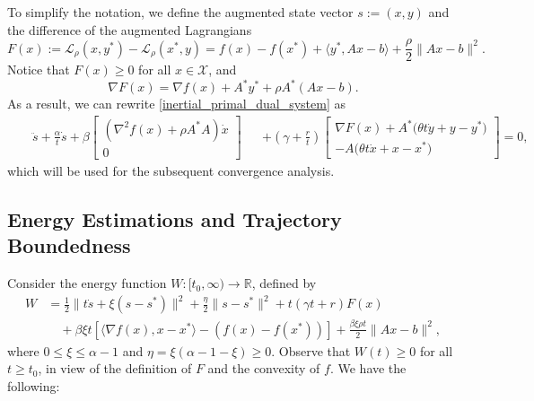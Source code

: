 \documentclass[pdflatex,sn-mathphys-num]{sn-jnl}
\theoremstyle{thmstyleone}
\theoremstyle{thmstyletwo}
\theoremstyle{thmstylethree}
\newcommand{\R}{\mathbb{R}}
\newcommand{\X}{\mathcal{X}}
\begin{document}
To simplify the notation, we define the augmented state vector $s := (x, y)$ and the difference of the augmented Lagrangians
\begin{equation}\label{E: F_ALM}
F(x) := \mathcal{L}_\rho(x,y^*) - \mathcal{L}_\rho(x^*,y) 
= f(x) - f(x^*) + \langle y^*, Ax-b \rangle + \frac{\rho}{2}\| Ax-b \|^2.
\end{equation}
Notice that $F(x)\ge 0$ for all $x\in\X$, and
\begin{equation*}
\nabla F(x) = 
\nabla f(x) + A^* y^* + \rho A^*(Ax-b).
\end{equation*}  
As a result, we can rewrite \eqref{inertial_primal_dual_system} as
\begin{equation}\label{E: primal_dual}
\begin{aligned}
&&\ddot{s} + \frac{\alpha}{t}\dot{s}+ \beta\begin{bmatrix}
 \left( \nabla^2 f(x) + \rho A^* A \right) \dot{x}  \\
0
\end{bmatrix}  
&& + \left( \gamma + \frac{r}{t} \right) \begin{bmatrix}
\nabla F(x)+A^*\big( \theta t \dot{y} + y - y^* \big)\\
-A \big( \theta t \dot{x} + x-x^* \big)
\end{bmatrix} = 0,
\end{aligned}
\end{equation}
which will be used for the subsequent convergence analysis.




\subsection{Energy Estimations and Trajectory Boundedness}
Consider the energy function $W:[t_0,\infty)\to\R$, defined by
\begin{equation}\label{E: W}
\begin{aligned}
W &= \frac{1}{2}\| t\dot{s} + \xi(s-s^*) \|^2 + \frac{\eta}{2}\| s-s^* \|^2 + t(\gamma t + r) F(x) \\ 
&\quad + \beta\xi t \left[ \langle \nabla f(x), x-x^* \rangle - \left( f(x) - f(x^*) \right) \right] 
 + \frac{\beta\xi \rho t}{2}\| Ax-b \|^2,
\end{aligned}
\end{equation}
where $0\le\xi\le \alpha-1$ and $\eta = \xi(\alpha-1-\xi)\ge 0$. Observe that $W(t)\ge 0$ for all $t\ge t_0$, in view of the definition of $F$ and the convexity of $f$. We have the following:
\end{document}

